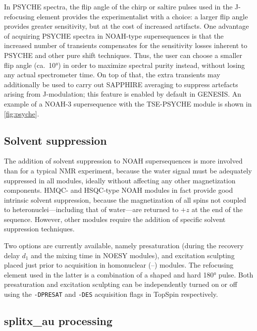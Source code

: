 \documentclass[a4paper,11pt]{article}
\newcommand{\proton}{\ch{^{1}H}}
\newcommand{\HH}{\proton{}--\proton{}}
\begin{document}
\begin{refsection}
In PSYCHE spectra, the flip angle of the chirp or saltire pulses used in the J-refocusing element provides the experimentalist with a choice: a larger flip angle provides greater sensitivity, but at the cost of increased artifacts.\autocite{Foroozandeh2018CEJ}
One advantage of acquiring PSYCHE spectra in NOAH-type supersequences is that the increased number of transients compensates for the sensitivity losses inherent to PSYCHE and other pure shift techniques.
Thus, the user can choose a smaller flip angle (ca.\ \ang{10}) in order to maximize spectral purity instead, without losing any actual spectrometer time.
On top of that, the extra transients may additionally be used to carry out SAPPHIRE averaging\autocite{Moutzouri2017CC} to suppress artefacts arising from J-modulation; this feature is enabled by default in GENESIS.
An example of a NOAH-3 supersequence with the TSE-PSYCHE module is shown in \cref{fig:psyche}.

\subsection{Solvent suppression}
\label{subsec:solvsupp}

The addition of solvent suppression to NOAH supersequences is more involved than for a typical NMR experiment, because the water signal must be adequately suppressed in all modules, ideally without affecting any other magnetization components.
HMQC- and HSQC-type NOAH modules in fact provide good intrinsic solvent suppression, because the magnetization of all \proton{} spins not coupled to heteronuclei---including that of water---are returned to $+z$ at the end of the sequence.
However, other modules require the addition of specific solvent suppression techniques.

Two options are currently available, namely presaturation (during the recovery delay $d_1$ and the mixing time in NOESY modules), and excitation sculpting placed just prior to acquisition in homonuclear (\HH{}) modules\autocite{Hwang1995JMR}.
The refocusing element used in the latter is a combination of a shaped and hard \ang{180} pulse.
Both presaturation and excitation sculpting can be independently turned on or off using the \texttt{-DPRESAT} and \texttt{-DES} acquisition flags in TopSpin respectively.

\subsection{splitx\_au processing}
\label{subsec:splitx_au}


\end{refsection}
\end{document}
